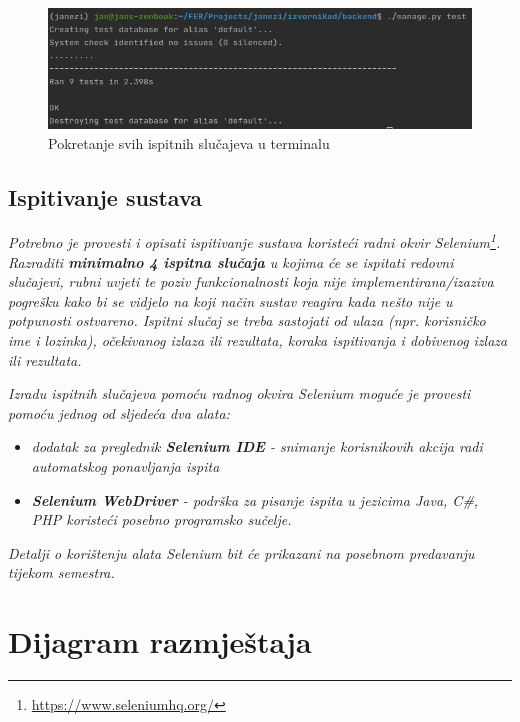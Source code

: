 			\begin{figure}[H]
				\centering
				\includegraphics[scale=0.65]{slike/TestsTerminal.PNG}
				\caption{Pokretanje svih ispitnih slučajeva u terminalu}
				\label{fig:TestsTerminal}
			\end{figure}
			
			
			\subsection{Ispitivanje sustava}
			
			 \textit{Potrebno je provesti i opisati ispitivanje sustava koristeći radni okvir Selenium\footnote{\url{https://www.seleniumhq.org/}}. Razraditi \textbf{minimalno 4 ispitna slučaja} u kojima će se ispitati redovni slučajevi, rubni uvjeti te poziv funkcionalnosti koja nije implementirana/izaziva pogrešku kako bi se vidjelo na koji način sustav reagira kada nešto nije u potpunosti ostvareno. Ispitni slučaj se treba sastojati od ulaza (npr. korisničko ime i lozinka), očekivanog izlaza ili rezultata, koraka ispitivanja i dobivenog izlaza ili rezultata.\\ }
			 
			 \textit{Izradu ispitnih slučajeva pomoću radnog okvira Selenium moguće je provesti pomoću jednog od sljedeća dva alata:}
			 \begin{itemize}
			 	\item \textit{dodatak za preglednik \textbf{Selenium IDE} - snimanje korisnikovih akcija radi automatskog ponavljanja ispita	}
			 	\item \textit{\textbf{Selenium WebDriver} - podrška za pisanje ispita u jezicima Java, C\#, PHP koristeći posebno programsko sučelje.}
			 \end{itemize}
		 	\textit{Detalji o korištenju alata Selenium bit će prikazani na posebnom predavanju tijekom semestra.}
			
			\eject 
		
		
		\section{Dijagram razmještaja}
			
